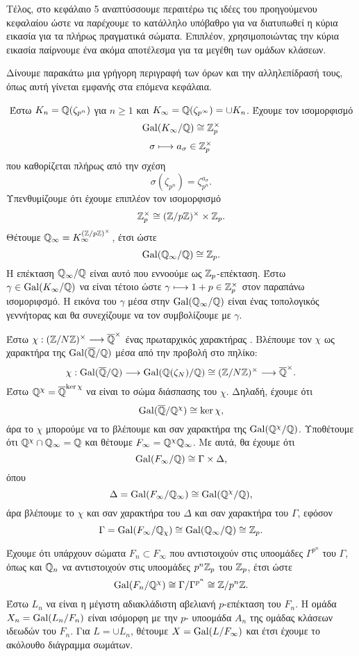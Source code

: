 Τέλος, στο κεφάλαιο 5 αναπτύσσουμε περαιτέρω τις ιδέες του προηγούμενου κεφαλαίου ώστε να παρέχουμε το κατάλληλο υπόβαθρο για να διατυπωθεί η κύρια εικασία για τα πλήρως πραγματικά σώματα. Επιπλέον, 
χρησιμοποιώντας την κύρια εικασία παίρνουμε ένα ακόμα αποτέλεσμα για τα μεγέθη των ομάδων κλάσεων.

Δίνουμε παρακάτω μια γρήγορη περιγραφή των όρων και την αλληλεπίδρασή τους, όπως αυτή γίνεται εμφανής στα επόμενα κεφάλαια.

$ $\newline
Έστω $K_n = \mathbb{Q}(\zeta_{p^n})$ για $n \geq 1$ και $K_\infty = \mathbb{Q}(\zeta_{p^\infty}) = \cup K_n$. Έχουμε τον ισομορφισμό
$$\operatorname{Gal}(K_\infty/\mathbb{Q}) \cong \mathbb{Z}^\times_p$$
$$ \sigma \longmapsto a_\sigma \in \mathbb{Z}^\times_p$$ που καθορίζεται πλήρως από την σχέση
$$\sigma(\zeta_{p^n}) = \zeta_{p^n}^{a_\sigma}.$$ Υπενθυμίζουμε ότι έχουμε επιπλέον τον ισομορφισμό
$$\mathbb{Z}^\times_p \cong (\mathbb{Z}/p\mathbb{Z})^\times \times \mathbb{Z}_p .$$ Θέτουμε $\mathbb{Q}_\infty = K_\infty^{(\mathbb{Z}/p\mathbb{Z})^\times}$, έτσι ώστε 
$$\operatorname{Gal}(\mathbb{Q}_\infty/\mathbb{Q}) \cong \mathbb{Z}_p.$$ Η επέκταση $\mathbb{Q}_\infty/\mathbb{Q}$ είναι αυτό που εννοούμε ως $\mathbb{Z}_p$-επέκταση. Έστω $\gamma \in \operatorname{Gal}(K_\infty/\mathbb{Q})$ να είναι τέτοιο ώστε 
$\gamma \longmapsto 1 + p \in \mathbb{Z}^\times_p$ στον παραπάνω ισομοριφσμό. Η εικόνα του $\gamma$ μέσα στην $\operatorname{Gal}(\mathbb{Q}_\infty/\mathbb{Q})$ είναι ένας τοπολογικός γεννήτορας 
και θα συνεχίζουμε να τον συμβολίζουμε με $\gamma$.

Έστω $\chi: (\mathbb{Z}/N\mathbb{Z})^\times \longrightarrow \overline{\mathbb{Q}}^\times$ ένας πρωταρχικός χαρακτήρας . Βλέπουμε τον 
$\chi$ ως χαρακτήρα της $\operatorname{Gal}(\overline{\mathbb{Q}}/\mathbb{Q})$ μέσα από την προβολή στο πηλίκο:
$$\chi : \operatorname{Gal}(\overline{\mathbb{Q}}/\mathbb{Q}) \longrightarrow \operatorname{Gal}(\mathbb{Q}(\zeta_N)/\mathbb{Q}) \cong (\mathbb{Z}/N\mathbb{Z})^\times \longrightarrow \overline{\mathbb{Q}}^\times .$$ Έστω 
$\mathbb{Q}^\chi = \overline{\mathbb{Q}}^{\ker \chi}$ να είναι το σώμα διάσπασης του $\chi$. Δηλαδή, έχουμε ότι
$$\operatorname{Gal}(\overline{\mathbb{Q}}/\mathbb{Q}^\chi) \cong \ker \chi ,$$ άρα το $\chi$ μπορούμε να το βλέπουμε και σαν χαρακτήρα της $\operatorname{Gal}(\mathbb{Q}^\chi/\mathbb{Q})$. Υποθέτουμε ότι $\mathbb{Q}^\chi \cap \mathbb{Q}_\infty = \mathbb{Q}$ και θέτουμε $F_\infty = \mathbb{Q}^\chi \mathbb{Q}_\infty$. Με αυτά, θα έχουμε ότι
$$\operatorname{Gal}(F_\infty/\mathbb{Q}) \cong \Gamma \times \Delta,$$ όπου
$$\Delta = \operatorname{Gal}(F_\infty/\mathbb{Q}_\infty) \cong \operatorname{Gal}(\mathbb{Q}^\chi/\mathbb{Q}),$$ άρα βλέπουμε το $\chi$ και σαν χαρακτήρα του $\Delta$ και σαν χαρακτήρα του $\Gamma$, εφόσον
$$\Gamma = \operatorname{Gal}(F_\infty/\mathbb{Q}_\chi) \cong \operatorname{Gal}(\mathbb{Q}_\infty/\mathbb{Q}) \cong \mathbb{Z}_p.$$ 


\noindent Έχουμε ότι υπάρχουν σώματα $F_n \subset F_\infty$ που αντιστοιχούν στις υποομάδες $\Gamma^{p^n}$ του $\Gamma$, όπως και $\mathbb{Q}_n$ να αντιστοιχούν στις υποομάδες $p^n\mathbb{Z}_p$ του $\mathbb{Z}_p$, έτσι ώστε 
$$\operatorname{Gal}(F_n/\mathbb{Q}^\chi) \cong \Gamma/\Gamma^{p^n} \cong \mathbb{Z}/p^n\mathbb{Z} .$$ Έστω $L_n$ να είναι η μέγιστη αδιακλάδιστη αβελιανή $p$-επέκταση του $F_n$. Η ομάδα $X_n = \operatorname{Gal}(L_n/F_n)$ είναι ισόμορφη με την $p$- υποομάδα $A_n$ της ομάδας κλάσεων ιδεωδών του $F_n$. Για $L = \cup L_n$, θέτουμε 
$X = \operatorname{Gal}(L/F_\infty)$ και έτσι έχουμε το ακόλουθο διάγραμμα σωμάτων.

